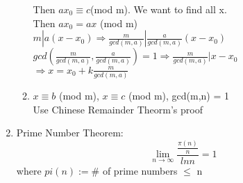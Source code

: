 \documentclass[10pt]{article}
\begin{document}
\begin{multicols}{2}
\begin{enumerate}
\begin{enumerate}
		Then $ax_0 \equiv c$(mod m). We want to find all x.\\
		Then $ax_0 = ax$ (mod m)\\
		$m | a(x-x_0)\Rightarrow \frac{m}{gcd(m,a)}|\frac{a}{gcd(m,a)}(x-x_0)$\\
		$gcd(\frac{m}{gcd(m,a)},\frac{a}{gcd(m,a)}) = 1\Rightarrow \frac{m}{gcd(m,a)}|x-x_0$\\
		$\Rightarrow x = x_0 + k\frac{m}{gcd(m,a)}$
		\item $x \equiv b$ (mod m), $x \equiv c$ (mod m), gcd(m,n) = 1\\
		Use Chinese Remainder Theorm's proof
	\end{enumerate}

	\item Prime Number Theorem:
	$$\lim_{n\rightarrow \infty}\frac{\frac{\pi(n)}{n}}{lnn} = 1 $$
	where $pi(n):= \#$ of prime numbers $\le$ n
	
	
	
	
	
\end{enumerate}
\newpage
\end{multicols}
\end{document}
